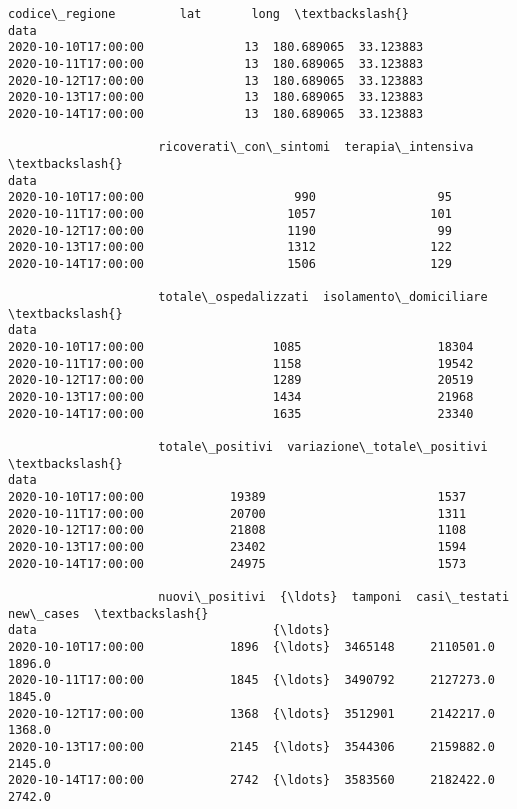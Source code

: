 \documentclass[11pt]{article}
\makeatletter
\newcommand{\boxspacing}{\kern\kvtcb@left@rule\kern\kvtcb@boxsep}
\newcommand{\prompt}[4]{
        \ttfamily\llap{{\color{#2}[#3]:\hspace{3pt}#4}}\vspace{-\baselineskip}
    }
\makeatother
\begin{document}
            \begin{tcolorbox}[breakable, size=fbox, boxrule=.5pt, pad at break*=1mm, opacityfill=0]
\prompt{Out}{outcolor}{10}{\boxspacing}
\begin{Verbatim}[commandchars=\\\{\}]
                     codice\_regione         lat       long  \textbackslash{}
data
2020-10-10T17:00:00              13  180.689065  33.123883
2020-10-11T17:00:00              13  180.689065  33.123883
2020-10-12T17:00:00              13  180.689065  33.123883
2020-10-13T17:00:00              13  180.689065  33.123883
2020-10-14T17:00:00              13  180.689065  33.123883

                     ricoverati\_con\_sintomi  terapia\_intensiva  \textbackslash{}
data
2020-10-10T17:00:00                     990                 95
2020-10-11T17:00:00                    1057                101
2020-10-12T17:00:00                    1190                 99
2020-10-13T17:00:00                    1312                122
2020-10-14T17:00:00                    1506                129

                     totale\_ospedalizzati  isolamento\_domiciliare  \textbackslash{}
data
2020-10-10T17:00:00                  1085                   18304
2020-10-11T17:00:00                  1158                   19542
2020-10-12T17:00:00                  1289                   20519
2020-10-13T17:00:00                  1434                   21968
2020-10-14T17:00:00                  1635                   23340

                     totale\_positivi  variazione\_totale\_positivi  \textbackslash{}
data
2020-10-10T17:00:00            19389                        1537
2020-10-11T17:00:00            20700                        1311
2020-10-12T17:00:00            21808                        1108
2020-10-13T17:00:00            23402                        1594
2020-10-14T17:00:00            24975                        1573

                     nuovi\_positivi  {\ldots}  tamponi  casi\_testati  new\_cases  \textbackslash{}
data                                 {\ldots}
2020-10-10T17:00:00            1896  {\ldots}  3465148     2110501.0     1896.0
2020-10-11T17:00:00            1845  {\ldots}  3490792     2127273.0     1845.0
2020-10-12T17:00:00            1368  {\ldots}  3512901     2142217.0     1368.0
2020-10-13T17:00:00            2145  {\ldots}  3544306     2159882.0     2145.0
2020-10-14T17:00:00            2742  {\ldots}  3583560     2182422.0     2742.0


\end{Verbatim}
\end{tcolorbox}
\end{document}
